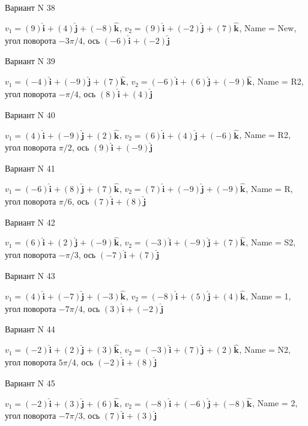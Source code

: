 \documentclass[11pt]{report}
\begin{document}
Вариант N 38

$v_1 = (9)\mathbf{\hat{i}_{}} + (4)\mathbf{\hat{j}_{}} + (-8)\mathbf{\hat{k}_{}}$, $v_2 = (9)\mathbf{\hat{i}_{}} + (-2)\mathbf{\hat{j}_{}} + (7)\mathbf{\hat{k}_{}}$, Name = New, угол поворота $- 3 \pi / 4$, ось $(-6)\mathbf{\hat{i}_{}} + (-2)\mathbf{\hat{j}_{}}$

Вариант N 39

$v_1 = (-4)\mathbf{\hat{i}_{}} + (-9)\mathbf{\hat{j}_{}} + (7)\mathbf{\hat{k}_{}}$, $v_2 = (-6)\mathbf{\hat{i}_{}} + (6)\mathbf{\hat{j}_{}} + (-9)\mathbf{\hat{k}_{}}$, Name = R2, угол поворота $- \pi / 4$, ось $(8)\mathbf{\hat{i}_{}} + (4)\mathbf{\hat{j}_{}}$

Вариант N 40

$v_1 = (4)\mathbf{\hat{i}_{}} + (-9)\mathbf{\hat{j}_{}} + (2)\mathbf{\hat{k}_{}}$, $v_2 = (6)\mathbf{\hat{i}_{}} + (4)\mathbf{\hat{j}_{}} + (-6)\mathbf{\hat{k}_{}}$, Name = R2, угол поворота $\pi / 2$, ось $(9)\mathbf{\hat{i}_{}} + (-9)\mathbf{\hat{j}_{}}$

Вариант N 41

$v_1 = (-6)\mathbf{\hat{i}_{}} + (8)\mathbf{\hat{j}_{}} + (7)\mathbf{\hat{k}_{}}$, $v_2 = (7)\mathbf{\hat{i}_{}} + (-9)\mathbf{\hat{j}_{}} + (-9)\mathbf{\hat{k}_{}}$, Name = R, угол поворота $\pi / 6$, ось $(7)\mathbf{\hat{i}_{}} + (8)\mathbf{\hat{j}_{}}$

Вариант N 42

$v_1 = (6)\mathbf{\hat{i}_{}} + (2)\mathbf{\hat{j}_{}} + (-9)\mathbf{\hat{k}_{}}$, $v_2 = (-3)\mathbf{\hat{i}_{}} + (-9)\mathbf{\hat{j}_{}} + (7)\mathbf{\hat{k}_{}}$, Name = S2, угол поворота $- \pi / 3$, ось $(-7)\mathbf{\hat{i}_{}} + (7)\mathbf{\hat{j}_{}}$

Вариант N 43

$v_1 = (4)\mathbf{\hat{i}_{}} + (-7)\mathbf{\hat{j}_{}} + (-3)\mathbf{\hat{k}_{}}$, $v_2 = (-8)\mathbf{\hat{i}_{}} + (5)\mathbf{\hat{j}_{}} + (4)\mathbf{\hat{k}_{}}$, Name = 1, угол поворота $- 7 \pi / 4$, ось $(3)\mathbf{\hat{i}_{}} + (-2)\mathbf{\hat{j}_{}}$

Вариант N 44

$v_1 = (-2)\mathbf{\hat{i}_{}} + (2)\mathbf{\hat{j}_{}} + (3)\mathbf{\hat{k}_{}}$, $v_2 = (-3)\mathbf{\hat{i}_{}} + (7)\mathbf{\hat{j}_{}} + (2)\mathbf{\hat{k}_{}}$, Name = N2, угол поворота $5 \pi / 4$, ось $(-2)\mathbf{\hat{i}_{}} + (8)\mathbf{\hat{j}_{}}$

Вариант N 45

$v_1 = (-2)\mathbf{\hat{i}_{}} + (3)\mathbf{\hat{j}_{}} + (6)\mathbf{\hat{k}_{}}$, $v_2 = (-8)\mathbf{\hat{i}_{}} + (-6)\mathbf{\hat{j}_{}} + (-8)\mathbf{\hat{k}_{}}$, Name = 2, угол поворота $- 7 \pi / 3$, ось $(7)\mathbf{\hat{i}_{}} + (3)\mathbf{\hat{j}_{}}$
\end{document}
